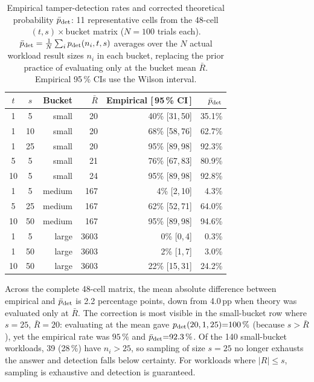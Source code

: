 \documentclass[journal]{IEEEtran}
\theoremstyle{tight}
\theoremstyle{remark}
\theoremstyle{plain}
\begin{document}
\begin{table}[!tb]
\centering
\caption{Empirical tamper-detection rates and corrected theoretical probability
$\bar{p}_{\rm det}$: 11 representative cells from the 48-cell
$(t,s)\times\text{bucket}$ matrix ($N{=}100$ trials each).
$\bar{p}_{\rm det}=\tfrac{1}{N}\sum_i p_{\rm det}(n_i,t,s)$ averages over
the $N$ actual workload result sizes $n_i$ in each bucket, replacing the
prior practice of evaluating only at the bucket mean $\bar{R}$.
Empirical 95\,\% CIs use the Wilson interval.}
\label{tab:tamper}
\small
\begin{tabular}{ccrr r r}
\toprule
$t$ & $s$ & Bucket & $\bar{R}$ &
Empirical [\,95\,\% CI\,] & $\bar{p}_{\rm det}$ \\
\midrule
1 &  5 & small  &   20 & 40\% [31,\,50] & 35.1\% \\
1 & 10 & small  &   20 & 68\% [58,\,76] & 62.7\% \\
1 & 25 & small  &   20 & 95\% [89,\,98] & 92.3\% \\
5 &  5 & small  &   21 & 76\% [67,\,83] & 80.9\% \\
10 & 5 & small  &   24 & 95\% [89,\,98] & 92.8\% \\
\midrule
1 &  5 & medium &  167 & 4\% [2,\,10]   &  4.3\% \\
5 & 25 & medium &  167 & 62\% [52,\,71] & 64.0\% \\
10 & 50 & medium & 167 & 95\% [89,\,98] & 94.6\% \\
\midrule
1 &  5 & large  & 3603 & 0\% [0,\,4]    &  0.3\% \\
1 & 50 & large  & 3603 & 2\% [1,\,7]    &  3.0\% \\
10 & 50 & large & 3603 & 22\% [15,\,31] & 24.2\% \\
\bottomrule
\end{tabular}
\end{table}

Across the complete 48-cell matrix, the mean absolute difference between
empirical and $\bar{p}_{\rm det}$ is 2.2 percentage points, down from
4.0\,pp when theory was evaluated only at $\bar{R}$.  The correction is most
visible in the small-bucket row where $s{=}25$, $\bar{R}{=}20$: evaluating at
the mean gave $p_{\rm det}(20,1,25){=}100\,\%$ (because $s{>}\bar{R}$), yet
the empirical rate was $95\,\%$ and $\bar{p}_{\rm det}{=}92.3\,\%$.
Of the 140 small-bucket workloads, 39 (28\,\%) have $n_i{>}25$, so sampling
of size $s{=}25$ no longer exhausts the answer and detection falls below
certainty.  For workloads where $|R|{\leq}s$, sampling is exhaustive and
detection is guaranteed.
\end{document}
